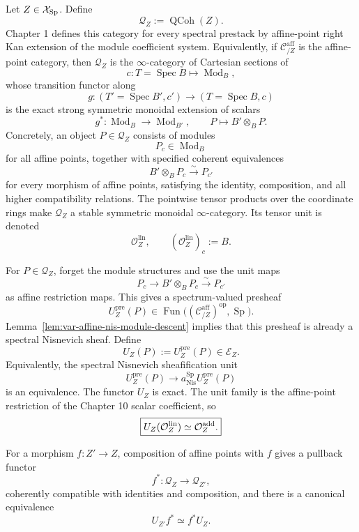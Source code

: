 \begin{construction}
\label{con:var-linear-coefficient-category}
Let \(Z\in\mathcal{X}_{\mathrm{Sp}}\).  Define
\[
    \boxed{
    \mathcal Q_Z
    :=
    \operatorname{QCoh}(Z).
    }
\]
Chapter 1 defines this category for every spectral prestack by affine-point right Kan extension of the module coefficient system.  Equivalently, if \(\mathcal C^{\mathrm{aff}}_{/Z}\) is the affine-point category, then \(\mathcal Q_Z\) is the \(\infty\)-category of Cartesian sections of
\[
    c:T=\operatorname{Spec}B\longmapsto\operatorname{Mod}_B,
\]
whose transition functor along
\[
    g:(T'=\operatorname{Spec}B',c')\longrightarrow(T=\operatorname{Spec}B,c)
\]
is the exact strong symmetric monoidal extension of scalars
\[
    g^*:
    \operatorname{Mod}_B
    \longrightarrow
    \operatorname{Mod}_{B'},
    \qquad
    P\longmapsto B'\otimes_BP.
\]
Concretely, an object \(P\in\mathcal Q_Z\) consists of modules
\[
    P_c\in\operatorname{Mod}_B
\]
for all affine points, together with specified coherent equivalences
\[
    B'\otimes_BP_c
    \xrightarrow{\sim}
    P_{c'}
\]
for every morphism of affine points, satisfying the identity, composition, and all higher compatibility relations.  The pointwise tensor products over the coordinate rings make \(\mathcal Q_Z\) a stable symmetric monoidal \(\infty\)-category.  Its tensor unit is denoted
\[
    \mathcal O_Z^{\mathrm{lin}},
    \qquad
    (\mathcal O_Z^{\mathrm{lin}})_c:=B.
\]

For \(P\in\mathcal Q_Z\), forget the module structures and use the unit maps
\[
    P_c\longrightarrow B'\otimes_BP_c\xrightarrow{\sim}P_{c'}
\]
as affine restriction maps.  This gives a spectrum-valued presheaf
\[
    U_Z^{\mathrm{pre}}(P)
    \in
    \operatorname{Fun}\bigl((\mathcal C^{\mathrm{aff}}_{/Z})^{\mathrm{op}},\operatorname{Sp}\bigr).
\]
Lemma~\ref{lem:var-affine-nis-module-descent} implies that this presheaf is already a spectral Nisnevich sheaf.  Define
\[
    \boxed{
    U_Z(P)
    :=
    U_Z^{\mathrm{pre}}(P)
    \in
    \mathcal E_Z.
    }
\]
Equivalently, the spectral Nisnevich sheafification unit
\[
    U_Z^{\mathrm{pre}}(P)
    \longrightarrow
    a_{\mathrm{Nis}}^{\operatorname{Sp}}U_Z^{\mathrm{pre}}(P)
\]
is an equivalence.  The functor \(U_Z\) is exact.  The unit family is the affine-point restriction of the Chapter 10 scalar coefficient, so
\[
    \boxed{
    U_Z(\mathcal O_Z^{\mathrm{lin}})
    \simeq
    \mathcal O^{\mathrm{add}}_Z.
    }
\]

For a morphism \(f:Z'\to Z\), composition of affine points with \(f\) gives a pullback functor
\[
    f^*:\mathcal Q_Z\longrightarrow\mathcal Q_{Z'},
\]
coherently compatible with identities and composition, and there is a canonical equivalence
\[
    \boxed{
    U_{Z'}f^*\simeq f^*U_Z.
    }
\]
\end{construction}

